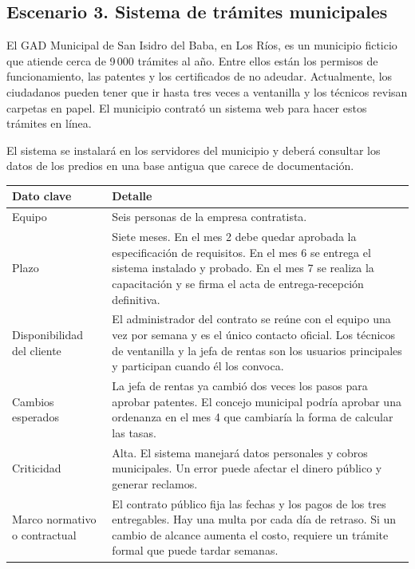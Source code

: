 \documentclass[11pt,a4paper]{article}
\begin{document}
	\subsection{Escenario 3. Sistema de trámites municipales}

	El GAD Municipal de San Isidro del Baba, en Los Ríos, es un municipio
	ficticio que atiende cerca de 9\,000 trámites al año. Entre ellos están
	los permisos de funcionamiento, las patentes y los certificados de no
	adeudar. Actualmente, los ciudadanos pueden tener que ir hasta tres
	veces a ventanilla y los técnicos revisan carpetas en papel. El municipio
	contrató un sistema web para hacer estos trámites en línea.

	El sistema se instalará en los servidores del municipio y deberá
	consultar los datos de los predios en una base antigua que carece de
	documentación.

	\begin{tabularx}{\textwidth}{|p{4cm}|Y|}
		\hline
		\textbf{Dato clave} & \textbf{Detalle} \\ \hline
		Equipo & Seis personas de la empresa contratista. \\ \hline
		Plazo & Siete meses. En el mes 2 debe quedar aprobada la
		especificación de requisitos. En el mes 6 se entrega el sistema
		instalado y probado. En el mes 7 se realiza la capacitación y se
		firma el acta de entrega-recepción definitiva. \\ \hline
		Disponibilidad del cliente & El administrador del contrato se reúne
		con el equipo una vez por semana y es el único contacto oficial.
		Los técnicos de ventanilla y la jefa de rentas son los usuarios
		principales y participan cuando él los convoca. \\ \hline
		Cambios esperados & La jefa de rentas ya cambió dos veces los pasos
		para aprobar patentes. El concejo municipal podría aprobar una
		ordenanza en el mes 4 que cambiaría la forma de calcular las tasas.
		\\ \hline
		Criticidad & Alta. El sistema manejará datos personales y cobros
		municipales. Un error puede afectar el dinero público y generar
		reclamos. \\ \hline
		Marco normativo o contractual & El contrato público fija las fechas
		y los pagos de los tres entregables. Hay una multa por cada día de
		retraso. Si un cambio de alcance aumenta el costo, requiere un
		trámite formal que puede tardar semanas. \\ \hline
	\end{tabularx}
\end{document}
